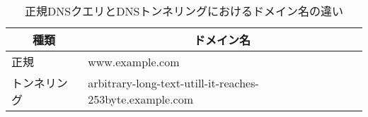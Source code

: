 \begin{table}[h]
 \caption{正規DNSクエリとDNSトンネリングにおけるドメイン名の違い}
 \centering
  \begin{tabular}{l|l}
    \toprule
		\multicolumn{1}{c}{\textbf{種類}} & \multicolumn{1}{c}{\textbf{ドメイン名}} \\
    \midrule
    正規 &  www.example.com \\ \hline
    トンネリング & arbitrary-long-text-utill-it-reaches-253byte.example.com\\
    \bottomrule
  \end{tabular}
 \label{tab:feature-tunnel}
\end{table}
